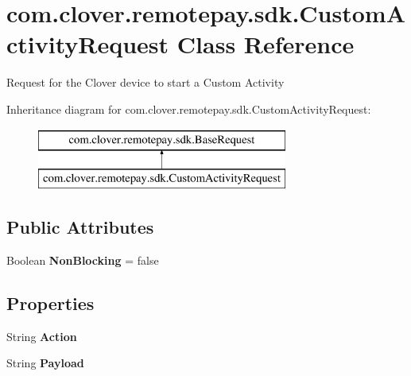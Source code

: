 \hypertarget{classcom_1_1clover_1_1remotepay_1_1sdk_1_1_custom_activity_request}{}\section{com.\+clover.\+remotepay.\+sdk.\+Custom\+Activity\+Request Class Reference}
\label{classcom_1_1clover_1_1remotepay_1_1sdk_1_1_custom_activity_request}


Request for the Clover device to start a Custom Activity  


Inheritance diagram for com.\+clover.\+remotepay.\+sdk.\+Custom\+Activity\+Request\+:\begin{figure}[H]
\begin{center}
\leavevmode
\includegraphics[height=2.000000cm]{classcom_1_1clover_1_1remotepay_1_1sdk_1_1_custom_activity_request}
\end{center}
\end{figure}
\subsection*{Public Attributes}
\begin{DoxyCompactItemize}
\item 
\mbox{\label{classcom_1_1clover_1_1remotepay_1_1sdk_1_1_custom_activity_request_a7e5e36c025db3a657191bff1c62a0522}} 
Boolean {\bfseries Non\+Blocking} = false
\end{DoxyCompactItemize}
\subsection*{Properties}
\begin{DoxyCompactItemize}
\item 
\mbox{\label{classcom_1_1clover_1_1remotepay_1_1sdk_1_1_custom_activity_request_ad5b9b21d0dff1a513fab0c91b4e73c10}} 
String {\bfseries Action}
\item 
\mbox{\label{classcom_1_1clover_1_1remotepay_1_1sdk_1_1_custom_activity_request_a90da946f0584992aff1b82e6012877b4}} 
String {\bfseries Payload}
\end{DoxyCompactItemize}


